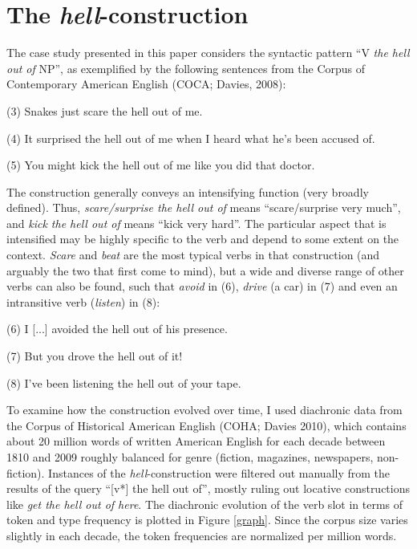 \documentclass[11pt]{article}
\begin{document}
\section{The \textit{hell}-construction}

The case study presented in this paper considers the syntactic pattern ``V \textit{the hell out of} NP'', as exemplified by the following sentences from the Corpus of Contemporary American English (COCA; Davies, 2008):

\begin{itemize*}
\item[(3)] Snakes just scare the hell out of me.
\item[(4)] It surprised the hell out of me when I heard what he's been accused of.
\item[(5)] You might kick the hell out of me like you did that doctor.
\end{itemize*}
	
The construction generally conveys an intensifying function (very broadly defined). Thus, \textit{scare/surprise the hell out of} means ``scare/surprise very much'', and \textit{kick the hell out of} means ``kick very hard''. The particular aspect that is intensified may be highly specific to the verb and depend to some extent on the context. \textit{Scare} and \textit{beat} are the most typical verbs in that construction (and arguably the two that first come to mind), but a wide and diverse range of other verbs can also be found, such that \textit{avoid} in (6), \textit{drive} (a car) in (7) and even an intransitive verb (\textit{listen}) in (8):

\begin{itemize*}
\item[(6)] I [...] avoided the hell out of his presence.
\item[(7)] But you drove the hell out of it!
\item[(8)] I've been listening the hell out of your tape.
\end{itemize*}
	
To examine how the construction evolved over time, I used diachronic data from the Corpus of Historical American English (COHA; Davies 2010), which contains about 20 million words of written American English for each decade between 1810 and 2009 roughly balanced for genre (fiction, magazines, newspapers, non-fiction). Instances of the \textit{hell}-construction were filtered out manually from the results of the query ``[v*] the hell out of'', mostly ruling out locative constructions like \textit{get the hell out of here}. The diachronic evolution of the verb slot in terms of token and type frequency is plotted in Figure \ref{graph}. Since the corpus size varies slightly in each decade, the token frequencies are normalized per million words.
\end{document}
